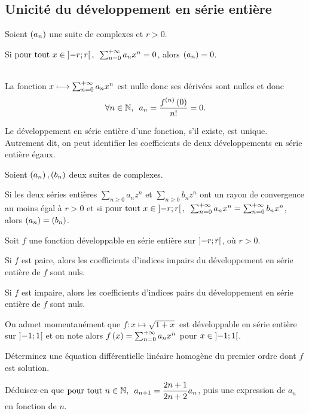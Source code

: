\subsection{Unicité du développement en série entière}

\begin{prop}
Soient \(\left(a_n\right)\) une suite de complexes et \(r>0\).

Si \(\quantifs{\tpt x\in\intervee{-r}{r}}\sum_{n=0}^{\pinf}a_nx^n=0\), alors \(\left(a_n\right)=0\).
\end{prop}

\begin{dem}~\\
La fonction \(x\longmapsto\sum_{n=0}^{+\infty}a_nx^n\) est nulle donc ses dérivées sont nulles et donc \[\quantifs{\forall n\in\N}a_n=\dfrac{f\deriv{n}\paren{0}}{n!}=0.\]
\end{dem}

Le développement en série entière d'une fonction, s'il existe, est unique. Autrement dit, on peut identifier les coefficients de deux développements en série entière égaux.

\begin{cor}
Soient \(\left(a_n\right),\left(b_n\right)\) deux suites de complexes.

Si les deux séries entières \(\sum_{n\geq0}a_nz^n\) et \(\sum_{n\geq0}b_nz^n\) ont un rayon de convergence au moins égal à \(r>0\) et si \(\quantifs{\tpt x\in\intervee{-r}{r}}\sum_{n=0}^{\pinf}a_nx^n=\sum_{n=0}^{\pinf}b_nx^n\), alors \(\left(a_n\right)=\left(b_n\right)\).
\end{cor}

\begin{cor}
Soit \(f\) une fonction développable en série entière sur \(\left]-r;r\right[\), où \(r>0\).

Si \(f\) est paire, alors les coefficients d'indices impairs du développement en série entière de \(f\) sont nuls.

Si \(f\) est impaire, alors les coefficients d'indices pairs du développement en série entière de \(f\) sont nuls.
\end{cor}

\begin{exo}
On admet momentanément que \(f:x\mapsto\sqrt{1+x}\) est développable en série entière sur \(\left]-1;1\right[\) et on note alors \(f\left(x\right)=\sum_{n=0}^{+\infty}a_nx^n\) pour \(x\in\left]-1;1\right[\).

Déterminez une équation différentielle linéaire homogène du premier ordre dont \(f\) est solution.

Déduisez-en que \(\quantifs{\tpt n\in\N}a_{n+1}=\dfrac{2n+1}{2n+2}a_n\), puis une expression de \(a_n\) en fonction de \(n\).
\end{exo}

